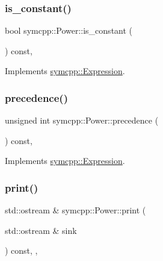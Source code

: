 \subsubsection{\texorpdfstring{is\_constant()}{is\_constant()}}
{\footnotesize\ttfamily bool symcpp\+::\+Power\+::is\+\_\+constant (\begin{DoxyParamCaption}{ }\end{DoxyParamCaption}) const\hspace{0.3cm}{\ttfamily [override]}, {\ttfamily [virtual]}}



Implements \mbox{\hyperlink{classsymcpp_1_1Expression_a30db7917c8948e22330cbe8259caeae2}{symcpp\+::\+Expression}}.

\mbox{\label{classsymcpp_1_1Power_a1287f36d506b82695187beae3f3c9a5e}} 
\subsubsection{\texorpdfstring{precedence()}{precedence()}}
{\footnotesize\ttfamily unsigned int symcpp\+::\+Power\+::precedence (\begin{DoxyParamCaption}{ }\end{DoxyParamCaption}) const\hspace{0.3cm}{\ttfamily [override]}, {\ttfamily [virtual]}}



Implements \mbox{\hyperlink{classsymcpp_1_1Expression_a181c162d5740faac392ffdca26bfca0c}{symcpp\+::\+Expression}}.

\mbox{\label{classsymcpp_1_1Power_aeddeec10b104818656e7f2f1536abccc}} 
\subsubsection{\texorpdfstring{print()}{print()}}
{\footnotesize\ttfamily std\+::ostream \& symcpp\+::\+Power\+::print (\begin{DoxyParamCaption}\item[{std\+::ostream \&}]{sink }\end{DoxyParamCaption}) const\hspace{0.3cm}{\ttfamily [override]}, {\ttfamily [private]}, {\ttfamily [virtual]}}




